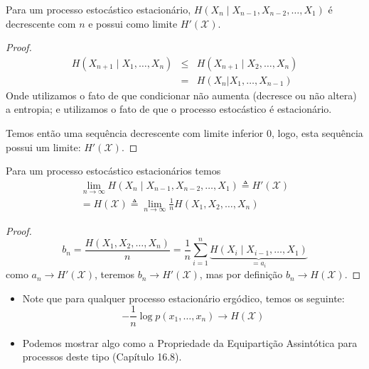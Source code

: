 \begin{frame}[allowframebreaks]
  \framebreak

  \begin{theorem}
  Para um processo estocástico estacionário, $H(X_n \mid X_{n-1}, X_{n-2}, \ldots , X_1)$ é decrescente com $n$ e possui como limite $H'(\mathcal{X})$.
  \end{theorem}
  \begin{proof}
  \begin{eqnarray}
  H(X_{n+1} \mid X_1, \ldots, X_n) &\leq& H(X_{n+1} \mid X_2, \ldots, X_n) \nonumber \\
		&=& H(X_n | X_1, \ldots, X_{n-1})
  \end{eqnarray}
  Onde utilizamos o fato de que condicionar não aumenta (decresce ou não altera) a entropia; 
  e utilizamos o fato de que o processo estocástico é estacionário.

  Temos então uma sequência decrescente com limite inferior $0$, logo, esta sequência possui um limite: $H'(\mathcal{X})$.
  \end{proof}


  \framebreak

  \begin{theorem}
  Para um processo estocástico estacionários temos
	\begin{eqnarray}
	\lim_{n \rightarrow \infty} H(X_n \mid X_{n-1}, X_{n-2}, \ldots, X_1) \triangleq H'(\mathcal{X}) \nonumber \\
		= H(\mathcal{X}) \triangleq \lim_{n \rightarrow \infty} \frac{1}{n} H(X_1,X_2,\ldots,X_n)
	\end{eqnarray}
  \end{theorem}

  \begin{proof}
	\begin{equation}
	b_n = \frac{H(X_1,X_2,\ldots,X_n)}{n} = \frac{1}{n} \sum_{i=1}^n \underbrace{H(X_i \mid X_{i-1}, \ldots, X_1)}_{=a_i}
	\end{equation}
  como $a_n \rightarrow H'(\mathcal{X})$, teremos $b_n \rightarrow H'(\mathcal{X})$, mas por definição $b_n \rightarrow H(\mathcal{X})$.
  \end{proof}

  \framebreak

  \begin{itemize}
  \item Note que para qualquer processo estacionário ergódico, temos os seguinte:
	\begin{equation}
	-\frac{1}{n} \log p(x_1, \ldots, x_n) \rightarrow H(\mathcal{X})
	\end{equation}
  \item Podemos mostrar algo como a Propriedade da Equipartição Assintótica para processos deste tipo (Capítulo 16.8).
  \end{itemize}
\end{frame}


